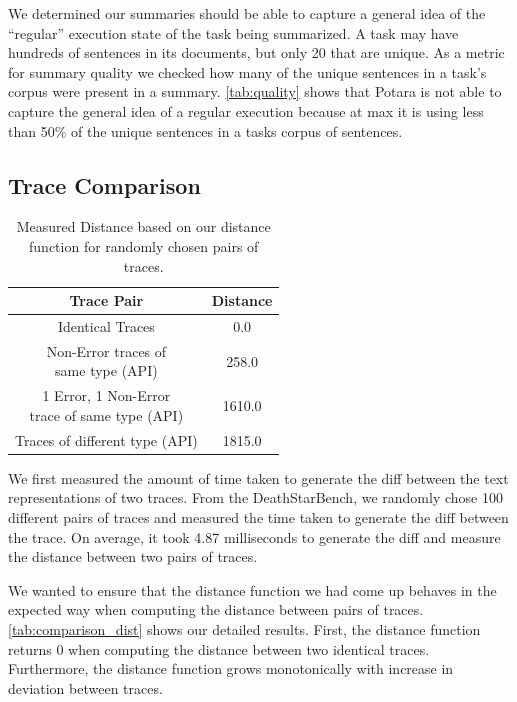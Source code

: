  We determined our summaries should be able to capture a general idea of the ``regular'' execution state of the task being summarized. 
A task may have hundreds of sentences in its documents, but only 20 that are unique. As a metric for summary quality
we checked how many of the unique sentences in a task's corpus were present in a summary. \autoref{tab:quality} shows that Potara is not able to capture 
the general idea of a regular execution because at max it is using less than 50\% of the unique sentences in a tasks corpus of sentences.

\subsection{Trace Comparison}

\begin{table}[]
    \begin{tabular}{|c|c|}
    \hline
    Trace Pair                              & Distance \\
    \hline
    \hline
    Identical Traces                        & 0.0      \\
    \hline
    \makecell{Non-Error traces of \\ same type (API)}     & 258.0    \\
    \hline
    \makecell{1 Error, 1 Non-Error \\ trace of same type (API)} & 1610.0  \\
    \hline
    Traces of different type (API)          & 1815.0   \\
    \hline
    \end{tabular}
    \caption{Measured Distance based on our distance function for randomly chosen pairs of traces.}
    \label{tab:comparison_dist}
\end{table}

 We first measured the amount of time taken to generate the diff between the text representations
of two traces. From the DeathStarBench, we randomly chose 100 different pairs of traces and measured the time taken
to generate the diff between the trace. On average, it took 4.87 milliseconds to generate the diff and measure the distance
between two pairs of traces.

 We wanted to ensure that the distance function we had come up behaves in the expected way
when computing the distance between pairs of traces. \autoref{tab:comparison_dist} shows our detailed results. First,
the distance function returns 0 when computing the distance between two identical traces. Furthermore, the distance function
grows monotonically with increase in deviation between traces. 

